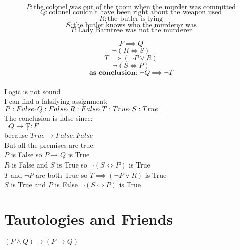\documentclass[a4paper,12pt]{article}
\newcommand{\CommaPunct}{\mathpunct{\raisebox{0.5ex}{,}}}
\begin{document}
\[
P: \text{the colonel was out of the room when the murder was committed}  
\]
\[
Q: \text{colonel couldn't have been right about the weapon used} 
\]
\[
R: \text{the butler is lying} 
\]
\[
S: \text{the butler knows who the murderer was}
\]
\[
T: \text{Lady Barntree was not the murderer} 
\]

\begin{equation} 
P \implies Q 
\end{equation}
\begin{equation} 
\neg(R \iff S)
\end{equation}
\begin{equation} 
T \implies (\neg P \vee R)
\end{equation}
\begin{equation} 
\neg(S \iff P)
\end{equation}
\begin{equation} 
\textbf{as conclusion: } \neg Q \implies \neg T
\end{equation}\\
Logic is not sound\\
I can find a falsifying assignment:\\
$P:False \CommaPunct Q:False \CommaPunct R:False\CommaPunct T:True \CommaPunct S:True$\\
The conclusion is false since:\\
$\lnot Q \rightarrow \not T : F$\\
because $True \rightarrow False : False$\\
But all the premises are true:\\
$P$ is False so $P \rightarrow Q$ is True\\
$R$ is False and $S$ is True so $\neg(S \iff P)$ is True\\
$T$ and $\lnot P$ are both True so $T \implies (\neg P \vee R)$ is True\\
$S$ is True and $P$ is False $\neg(S \iff P)$ is True\\
\pagebreak
\section{Tautologies and Friends}

$(P \wedge Q) \rightarrow (P \rightarrow Q)$\\
\end{document}
